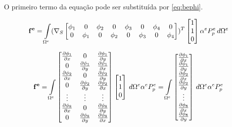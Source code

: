 O primeiro termo da equação pode ser substituída por \eqref{eq:bephi}.


\begin{equation}
   \mathbf{ f^e } = \omeeint{(\sopnabla \begin{bmatrix}
                        \phi_1 & 0      & \phi_2 & 0 & \phi_3 & 0 & \phi_4 & 0\\
                        0      & \phi_1 & 0 & \phi_2 & 0 & \phi_3 & 0 & \phi_4
                    \end{bmatrix} ) ^ T \begin{bmatrix}
                    1\\1\\0
                    \end{bmatrix} \alpha^e P^e_p}
\end{equation}

\begin{equation} \label{eq:cargafinal}
   \mathbf{ f^e } = \omeeint{\begin{bmatrix}
    \dx[\phi_1] & 0           & \dy[\phi_1] \\
    0           & \dy[\phi_1] & \dx[\phi_1] \\
    \dx[\phi_2] & 0           & \dy[\phi_2] \\
    0           & \dy[\phi_2] & \dx[\phi_2] \\
    \vdots      & \vdots & \vdots      \\

    \dx[\phi_8] & 0           & \dy[\phi_8] \\
    0           & \dy[\phi_8] & \dx[\phi_8] \\

    \end{bmatrix} \begin{bmatrix}  1\\1\\0 \end{bmatrix} } \alpha^e P^e_p 
    = \omeeint{\begin{bmatrix}
      \dx[\phi_1] \\
      \dy[\phi_1] \\
      \dx[\phi_2] \\
      \dy[\phi_2] \\
      \vdots      \\
      \dx[\phi_8] \\
      \dy[\phi_8] \\
    \end{bmatrix} } \alpha^e P^e_p 
\end{equation}


